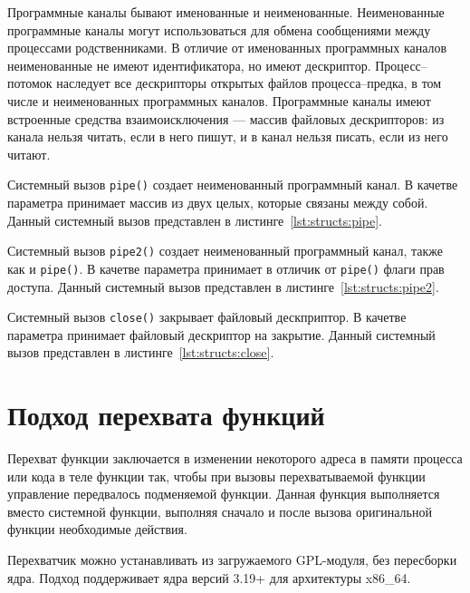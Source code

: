 Программные каналы бывают именованные и неименованные. 
Неименованные программные каналы могут использоваться для обмена сообщениями между процессами родственниками. В отличие от именованных программных каналов неименованные не имеют идентификатора, но имеют дескриптор. Процесс--потомок наследует все дескрипторы открытых файлов процесса--предка, в том числе и неименованных программных каналов. Программные каналы имеют встроенные средства взаимоисключения --- массив файловых дескрипторов: из канала нельзя читать, если в него пишут, и в канал нельзя писать, если из него читают.

Системный вызов \texttt{pipe()} создает неименованный программный канал. В качетве параметра принимает массив из двух целых, которые связаны между собой. Данный системный вызов представлен в листинге~\ref{lst:structs:pipe}.



Системный вызов \texttt{pipe2()} создает неименованный программный канал, также как и \texttt{pipe()}. В качетве параметра принимает в отличик от \texttt{pipe()} флаги прав доступа. Данный системный вызов представлен в листинге~\ref{lst:structs:pipe2}.



Системный вызов \texttt{close()} закрывает  файловый дескприптор. В качетве параметра принимает файловый дескриптор на закрытие. Данный системный вызов представлен в листинге~\ref{lst:structs:close}.



\section{Подход перехвата функций}

Перехват функции заключается в изменении  некоторого адреса в памяти процесса или кода в теле функции так, чтобы при вызовы перехватываемой функции управление передвалось подменяемой функции.
Данная функция выполняется вместо системной функции, выполняя сначало и после вызова оригинальной функции необходимые действия.

Перехватчик можно устанавливать из загружаемого GPL-модуля, без пересборки ядра. Подход поддерживает ядра версий 3.19+ для архитектуры x86\_64.

